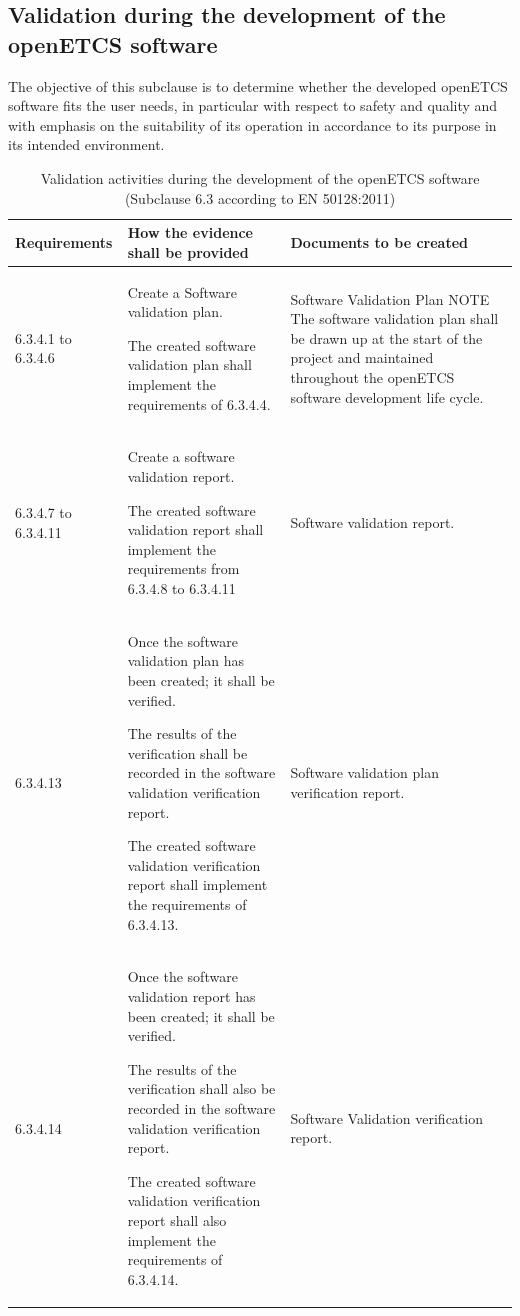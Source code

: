 \documentclass{template/openetcs_report}
\begin{document}
\subsection{Validation during the development of the openETCS software}
\begin{flushleft}
The objective of this subclause is to determine whether the developed openETCS software fits the user needs, in particular with respect to safety and quality and with emphasis on the suitability of its operation in accordance to its purpose in its intended environment.
\end{flushleft}
{\footnotesize\sffamily\centering
\begin{longtable}{|p{2cm}|p{9cm}|p{3cm}|}
\caption{Validation activities during the development of the openETCS software (Subclause 6.3 according to EN 50128:2011)}\\
\hline
\bfseries Requirements & \bfseries How the evidence shall be provided & \bfseries Documents to be created\\
\hline
\hline
\endhead
\hline
\endfoot

6.3.4.1 to 6.3.4.6 & Create a Software validation plan.

The created software validation plan shall implement the requirements of 6.3.4.4.
& Software Validation Plan
\linebreak
\linebreak
NOTE\linebreak
The software validation plan shall be drawn up at the start of the project and maintained throughout the openETCS software development life cycle.\\ 
\hline
6.3.4.7 to 6.3.4.11 & Create a software validation report.

The created software validation report shall implement the requirements from 6.3.4.8 to 6.3.4.11
& Software validation report.\\ 
\hline
6.3.4.13 & Once the software validation plan has been created; it shall be verified.

The results of the verification shall be recorded in the software validation verification report.

The created software validation verification report shall implement the requirements of 6.3.4.13.
& Software validation plan verification report.\\ 
\hline
6.3.4.14 & Once the software validation report has been created; it shall be verified.

The results of the verification shall also be recorded in the software validation verification report.

The created software validation verification report shall also implement the requirements of 6.3.4.14.
& Software Validation verification report.\\ 
\hline
\end{longtable}}
\end{document}
